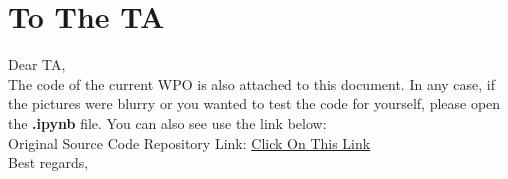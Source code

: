 \documentclass[11pt]{article}
\newcommand{\repositoryLink}{\href{}{Click On This Link}}
\begin{document}
%
%
\tableofcontents
\newpage

 \section{To The TA}
Dear TA, \\
The code of the current WPO is also attached to this document. In any case, if the pictures were blurry or you wanted to test the code for yourself, please open the \textbf{.ipynb} file. You can also see use the link below:\\[6pt]
Original Source Code Repository Link: \repositoryLink \\[8pt]
Best regards,\\
 

 
 
 
 
 
 
 
    
    
\end{document}
